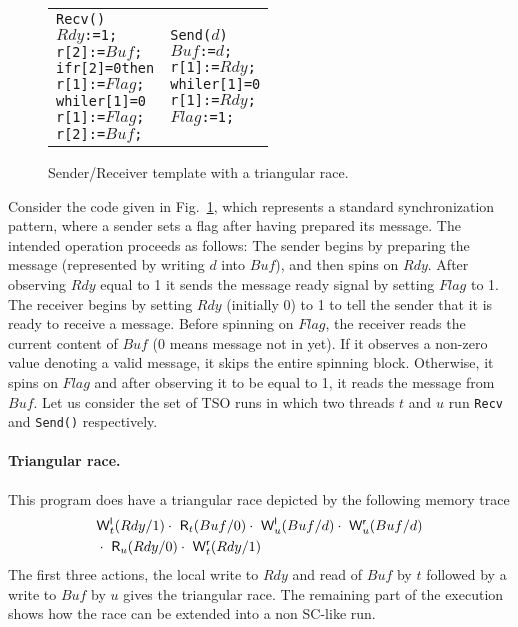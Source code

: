 \begin{figure}[h]
\begin{tabular}{p{}p{}}
\begin{alltt}Recv()
 \(Rdy\):=1;
 r[2]:=\(Buf\);
 if r[2]=0 then
   r[1]:=\(Flag\);
   while r[1]=0 
     r[1]:=\(Flag\);
   r[2]:=\(Buf\);\end{alltt}
&
\begin{alltt}Send(\(d\))
 \(Buf\):=\(d\);
 r[1]:=\(Rdy\);
 while r[1]=0 
   r[1]:=\(Rdy\);
 \(Flag\):=1;\end{alltt}
\end{tabular}
\caption{Sender/Receiver template with a triangular race.}
\label{fig:send-receive}
\end{figure}

Consider the code given in Fig.~\ref{fig:send-receive}, which represents a standard synchronization pattern, where a sender sets a flag after having prepared its message.
The intended operation proceeds as follows:
The sender begins by preparing the message (represented by writing $d$ into $Buf$), and then spins on $Rdy$.
After observing $Rdy$ equal to 1 it sends the message ready signal by setting $Flag$ to 1.
The receiver begins by setting $Rdy$ (initially 0) to 1 to tell the sender that it is ready to receive a message.
Before spinning on $Flag$, the receiver reads the current content of $Buf$ (0 means message not in yet).
If it observes a non-zero value denoting a valid message, it skips the entire spinning block.
Otherwise, it spins on $Flag$ and after observing it to be equal to 1, it reads the message from $Buf$.
Let us consider the set of TSO runs in which two threads $t$ and $u$ run {\tt Recv} and {\tt Send()} respectively.

\paragraph{Triangular race.}
This program does have a triangular race depicted by the following memory trace
\begin{eqnarray*}
& \mathsf{W}^{\mathsf{l}}_{t}(Rdy/1) \cdot\ \mathsf{R}_{t}(Buf/0)\cdot\ \mathsf{W}^{\mathsf{l}}_{u}(Buf/d) \cdot\ \mathsf{W}^{\mathsf{r}}_{u}(Buf/d)\\
&\cdot\ \mathsf{R}_{u}(Rdy/0)\cdot\ \mathsf{W}^{\mathsf{r}}_{t}(Rdy/1)
\end{eqnarray*}
The first three actions, the local write to $Rdy$ and read of $Buf$ by $t$ followed by a write to $Buf$ by $u$ gives the triangular race.
The remaining part of the execution shows how the race can be extended into a non SC-like run. 

